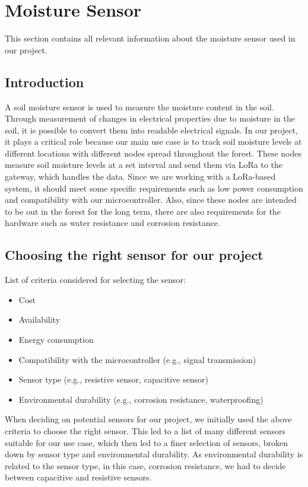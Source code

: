 \section{{Moisture Sensor}}

This section contains all relevant information about the moisture sensor used in our project.

\subsection{Introduction}

A soil moisture sensor is used to measure the moisture content in the soil. Through measurement of changes in electrical properties due to moisture in the soil, it is possible to convert them into readable electrical signals. 
In our project, it plays a critical role because our main use case is to track soil moisture levels at different locations with different nodes spread throughout the forest. These nodes measure soil moisture levels at a set interval and send them via LoRa to the gateway, which handles the data. Since we are working with a LoRa-based system, it should meet some specific requirements such as low power consumption and compatibility with our microcontroller. Also, since these nodes are intended to be out in the forest for the long term, there are also requirements for the hardware such as water resistance and corrosion resistance.

\subsection{Choosing the right sensor for our project}

List of criteria considered for selecting the sensor:

\begin{itemize}
    \item Cost
    \item Availability
    \item Energy consumption
    \item Compatibility with the microcontroller (e.g., signal transmission) 
    \item Sensor type (e.g., resistive sensor, capacitive sensor)
    \item Environmental durability (e.g., corrosion resistance, waterproofing)
\end{itemize}

When deciding on potential sensors for our project, we initially used the above criteria to choose the right sensor. This led to a list of many different sensors suitable for our use case, which then led to a finer selection of sensors, broken down by sensor type and environmental durability. As environmental durability is related to the sensor type, in this case, corrosion resistance, we had to decide between capacitive and resistive sensors.
    

